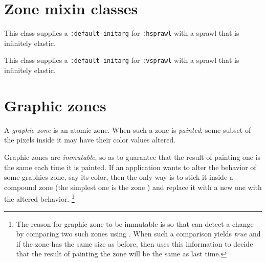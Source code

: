 \section{Zone mixin classes}


This class supplies a \texttt{:default-initarg} for \texttt{:hsprawl}
with a sprawl that is infinitely elastic.


This class supplies a \texttt{:default-initarg} for \texttt{:vsprawl}
with a sprawl that is infinitely elastic.













\section{Graphic zones}
\label{sec-zones-graphic}

A \emph{graphic zone} is an atomic zone.  When such a zone is
\emph{painted}, some subset of the pixels inside it may have their
color values altered.

Graphic zones are \emph{immutable}, so as to guarantee that the result
of painting one is the same each time it is painted.  If an
application wants to alter the behavior of some graphics zone, say its
color, then the only way is to stick it inside a compound zone (the
simplest one is the  zone )
and replace it with a new one with the altered behavior.%
\footnote{The reason for graphic zone to be immutable is so that
  \clim{} can detect a change by comparing two such zones using
  .  When such a comparison yields \emph{true} and if the
  zone has the same size as before, then \clim{} uses this information
  to decide that the result of painting the zone will be the same as
  last time.}


